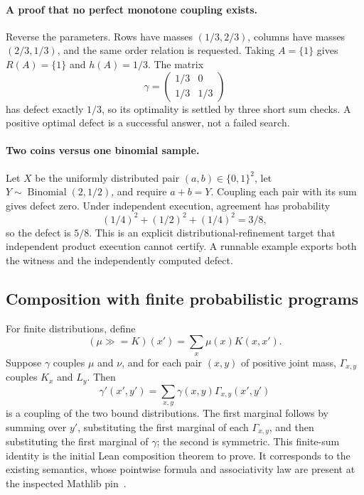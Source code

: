 \paragraph{A proof that no perfect monotone coupling exists.}
Reverse the parameters. Rows have masses $(1/3,2/3)$, columns have masses
$(2/3,1/3)$, and the same order relation is requested. Taking $A=\{1\}$ gives
$R(A)=\{1\}$ and $h(A)=1/3$. The matrix
\[
 \gamma=\begin{pmatrix}1/3&0\\1/3&1/3\end{pmatrix}
\]
has defect exactly $1/3$, so its optimality is settled by three short sum
checks. A positive optimal defect is a successful answer, not a failed search.

\paragraph{Two coins versus one binomial sample.}
Let $X$ be the uniformly distributed pair $(a,b)\in\{0,1\}^2$, let
$Y\sim\operatorname{Binomial}(2,1/2)$, and require $a+b=Y$. Coupling each pair
with its sum gives defect zero. Under independent execution, agreement has
probability
\[
 (1/4)^2+(1/2)^2+(1/4)^2=3/8,
\]
so the defect is $5/8$. This is an explicit distributional-refinement target
that independent product execution cannot certify. A runnable example exports
both the witness and the independently computed defect.

\subsection{Composition with finite probabilistic programs}

For finite distributions, define
\[
 (\mu\mathbin{\gg=}K)(x')=\sum_x\mu(x)K(x,x').
\]
Suppose $\gamma$ couples $\mu$ and $\nu$, and for each pair $(x,y)$ of positive
joint mass, $\Gamma_{x,y}$ couples $K_x$ and $L_y$. Then
\begin{equation}
 \gamma'(x',y')=\sum_{x,y}\gamma(x,y)\Gamma_{x,y}(x',y')
 \label{eq:bind-coupling}
\end{equation}
is a coupling of the two bound distributions. The first marginal follows by
summing over $y'$, substituting the first marginal of each $\Gamma_{x,y}$,
and then substituting the first marginal of $\gamma$; the second is symmetric.
This finite-sum identity is the initial Lean composition theorem to prove.
It corresponds to the existing  semantics, whose pointwise
formula and associativity law are present at the inspected Mathlib
pin~\cite{mathlib-pmf}.

